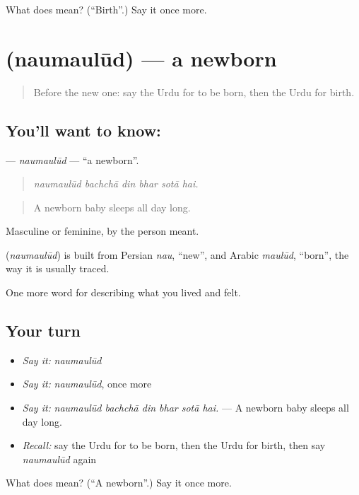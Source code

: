 \begin{tcolorbox}[breakable,colback=teal!4,colframe=teal!35!black,title={Before you move on}]
What does  mean? (\textquotedblleft{}Birth\textquotedblright{}.) Say it once more.
\end{tcolorbox}
\section[\texorpdfstring{\ur{نومولود} (naumaulūd)}{نومولود (naumaulūd)}]{ (naumaulūd) — a newborn}

\label{lesson:UR-C483-naumaulud}



\begin{quote}
Before the new one: say the Urdu for to be born, then the Urdu for birth.
\end{quote}

\subsection*{You'll want to know: }
\textbf{} — \emph{naumaulūd} — \textquotedblleft{}a newborn\textquotedblright{}.

\begin{quote}
     
\end{quote}

\begin{quote}
\emph{naumaulūd bachchā din bhar sotā hai.}
\end{quote}

\begin{quote}
A newborn baby sleeps all day long.
\end{quote}

Masculine or feminine, by the person meant.

\begin{cousinweb}
\textbf{} (\emph{naumaulūd}) is built from Persian \emph{nau}, \textquotedblleft{}new\textquotedblright{}, and Arabic \emph{maulūd}, \textquotedblleft{}born\textquotedblright{}, the way it is usually traced.
\end{cousinweb}

\begin{grammarlens}[title={What you've built}]
One more word for describing what you lived and felt.
\end{grammarlens}

\subsection*{Your turn}
\begin{itemize}
\raggedright
  \item \emph{Say it:} \emph{naumaulūd}
  \item \emph{Say it:} \emph{naumaulūd}, once more
  \item \emph{Say it:} \emph{naumaulūd bachchā din bhar sotā hai.} — A newborn baby sleeps all day long.
  \item \emph{Recall:} say the Urdu for to be born, then the Urdu for birth, then say \emph{naumaulūd} again
\end{itemize}

\begin{tcolorbox}[breakable,colback=teal!4,colframe=teal!35!black,title={Before you move on}]
What does  mean? (\textquotedblleft{}A newborn\textquotedblright{}.) Say it once more.
\end{tcolorbox}
